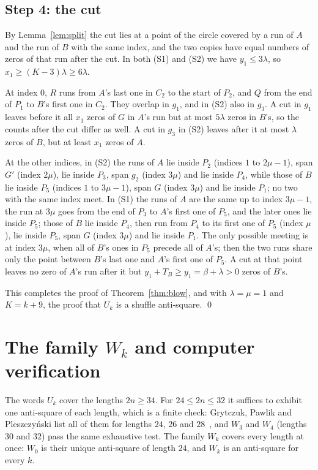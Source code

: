 \documentclass[12pt]{article}
\begin{document}
\subsection{Step 4: the cut}
By Lemma~\ref{lem:split} the cut lies at a point of the circle covered by a run of $A$ and the run of $B$ with
the same index, and the two copies have equal numbers of zeros of that run after the cut. In both (S1)
and (S2) we have $y_1 \le 3\lambda$, so $x_1 \ge (K-3)\lambda \ge 6\lambda$.

At index $0$, $R$ runs from $A$'s last one in $C_2$ to the start of $P_2$, and $Q$ from the end of $P_1$ to
$B$'s first one in $C_2$. They overlap in $g_1$, and in (S2) also in $g_3$. A cut in $g_1$ leaves before it
all $x_1$ zeros of $G$ in $A$'s run but at most $5\lambda$ zeros in $B$'s, so the counts after the cut differ
as well. A cut in $g_3$ in (S2) leaves after it at most $\lambda$ zeros of $B$, but at least $x_1$ zeros of $A$.

At the other indices, in (S2) the runs of $A$ lie inside $P_2$ (indices $1$ to $2\mu-1$), span $G'$
(index $2\mu$), lie inside $P_3$, span $g_2$ (index $3\mu$) and lie inside $P_4$, while those of $B$ lie
inside $P_5$ (indices $1$ to $3\mu-1$), span $G$ (index $3\mu$) and lie inside $P_1$; no two with the same
index meet. In (S1) the runs of $A$ are the same up to index $3\mu - 1$, the run at $3\mu$ goes from the end of
$P_3$ to $A$'s first one of $P_5$, and the later ones lie inside $P_5$; those of $B$ lie inside $P_4$, then
run from $P_4$ to its first one of $P_5$ (index $\mu$), lie inside $P_5$, span $G$ (index $3\mu$) and lie
inside $P_1$. The only possible meeting is at index $3\mu$, when all of $B$'s ones in $P_5$ precede all of
$A$'s; then the two runs share only the point between $B$'s last one and $A$'s first one of $P_5$.
A cut at that point leaves no zero of $A$'s run after it but $y_1 + T_B \ge y_1 = \beta + \lambda > 0$ zeros
of $B$'s.

This completes the proof of Theorem~\ref{thm:blow}, and with $\lambda = \mu = 1$ and $K = k+9$, the proof that
$U_k$ is a shuffle anti-square. \qed

\section{The family $W_k$ and computer verification}\label{sec:verify}

The words $U_k$ cover the lengths $2n \ge 34$. For $24 \le 2n \le 32$ it suffices to exhibit one anti-square of
each length, which is a finite check: Grytczuk, Pawlik and Pleszczy\'nski list all of them for lengths $24$,
$26$ and $28$~\cite{GPP}, and $W_3$ and $W_4$ (lengths $30$ and $32$) pass the same exhaustive test. The family
$W_k$ covers every length at once: $W_0$ is their unique anti-square of length $24$, and $W_k$ is an
anti-square for every $k$.
\end{document}
